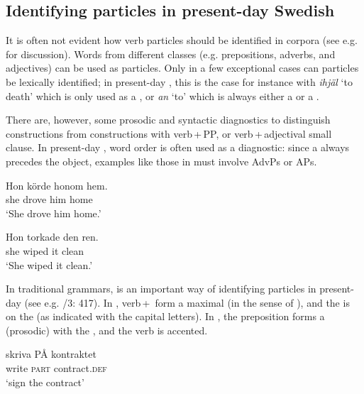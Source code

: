 \documentclass[output=paper]{langscibook}
\begin{document}
\subsection{Identifying particles in present-day Swedish}\label{sec:lalu:2.2}

It is often not evident how verb particles should be identified in corpora (see e.g. \citealt{LarssonRoxendal2020} for discussion). Words from different classes (e.g. prepositions, adverbs, and adjectives) can be used as particles. Only in a few exceptional cases can particles be lexically identified; in present-day , this is the case for instance with \textit{ihjäl} ‘to death’ which is only used as a , or \textit{an} ‘to’ which is always either a  or a .


\begin{sloppypar}
There are, however, some prosodic and syntactic diagnostics to distinguish  constructions from constructions with verb\,+\,PP, or verb\,+\,adjectival small clause. In present-day , word order is often used as a diagnostic: since a  always precedes the object, examples like those in  must involve AdvPs or APs.
\end{sloppypar}


\ea\label{ex:lalu:9}
\ea
\gll  Hon   körde   honom   hem.  \\
    she     drove   him     home\\
\glt `She drove him home.'

\ex
\gll  Hon   torkade   den   ren.\\
    she     wiped   it     clean\\
\glt `She wiped it clean.'
\z
\z

\begin{sloppypar}
In traditional grammars,  is an important way of identifying particles in present-day  (see e.g. \citealt{TelemanEtAl1999}/3: 417). In , verb\,+\, form a maximal  (in the sense of \citealt{MyrbergRiad2015}), and the  is on the  (as indicated with the capital letters). In , the  preposition forms a (prosodic)  with the , and the verb is accented.
\end{sloppypar}

\ea\label{ex:lalu:10}
\ea\label{ex:lalu:10a}
\gll  skriva   PÅ   kontraktet\\
    write     \textsc{part}   contract\textsc{.def}\\
\glt `sign the contract'
\end{document}
